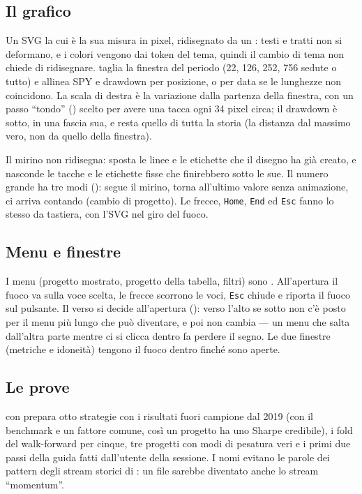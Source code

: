 \subsection{Il grafico}

Un SVG la cui  è la sua misura in pixel, ridisegnato da un
: testi e tratti non si deformano, e i colori vengono dai
token del tema, quindi il cambio di tema non chiede di ridisegnare.
 taglia la finestra del periodo (22, 126, 252, 756 sedute
o tutto) e allinea SPY e drawdown per posizione, o per data se le lunghezze
non coincidono. La scala di destra è la variazione dalla partenza della
finestra, con un passo \enquote{tondo} () scelto per avere una
tacca ogni 34 pixel circa; il drawdown è sotto, in una fascia sua, e resta
quello di tutta la storia (la distanza dal massimo vero, non da quello della
finestra).

Il mirino non ridisegna: sposta le linee e le etichette che il disegno ha già
creato, e nasconde le tacche e le etichette fisse che finirebbero sotto le
sue. Il numero grande ha tre modi ():  segue il
mirino,  torna all'ultimo valore senza animazione,  ci
arriva contando (cambio di progetto). Le frecce, \texttt{Home}, \texttt{End} ed
\texttt{Esc} fanno lo stesso da tastiera, con l'SVG nel giro del fuoco.

\subsection{Menu e finestre}

I menu (progetto mostrato, progetto della tabella, filtri) sono
. All'apertura il fuoco va sulla voce scelta, le frecce
scorrono le voci, \texttt{Esc} chiude e riporta il fuoco sul pulsante. Il
verso si decide all'apertura (): verso l'alto se sotto non
c'è posto per il menu più lungo che può diventare, e poi non cambia --- un
menu che salta dall'altra parte mentre ci si clicca dentro fa perdere il
segno. Le due finestre (metriche e idoneità) tengono il fuoco dentro finché
sono aperte.

\subsection{Le prove}

 con  prepara otto strategie con
i risultati fuori campione dal 2019 (con il benchmark e un fattore comune,
così un progetto ha uno Sharpe credibile), i fold del walk-forward per
cinque, tre progetti con modi di pesatura veri e i primi due passi della
guida fatti dall'utente della sessione. I nomi evitano le parole dei pattern
degli stream storici di : un file
 sarebbe diventato anche lo stream
\enquote{momentum}.

